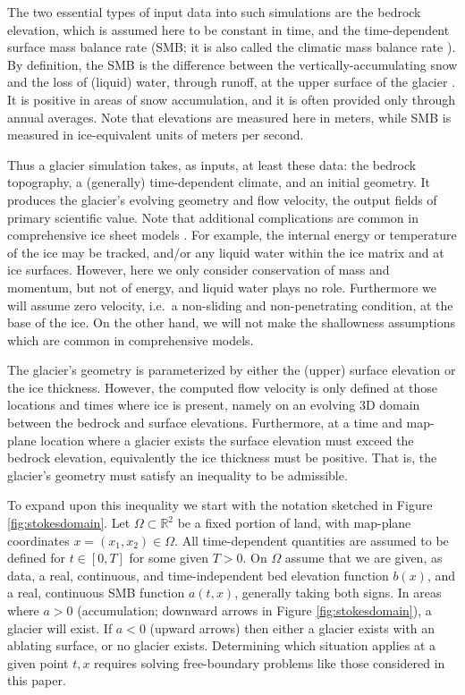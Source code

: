 \documentclass[hidelinks,onefignum,onetabnum,final]{siamart220329}  %
\newcommand{\RR}{\mathbb{R}}
\begin{document}
The two essential types of input data into such simulations are the bedrock elevation, which is assumed here to be constant in time, and the time-dependent surface mass balance rate (SMB; it is also called the climatic mass balance rate \cite{Cogleyetal2011}).  By definition, the SMB is the difference between the vertically-accumulating snow and the loss of (liquid) water, through runoff, at the upper surface of the glacier \cite{Cogleyetal2011}.  It is positive in areas of snow accumulation, and it is often provided only through annual averages.  Note that elevations are measured here in meters, while SMB is measured in ice-equivalent units of meters per second.

Thus a glacier simulation takes, as inputs, at least these data: the bedrock topography, a (generally) time-dependent climate, and an initial geometry.  It produces the glacier's evolving geometry and flow velocity, the output fields of primary scientific value.  Note that additional complications are common in comprehensive ice sheet models \cite{SchoofHewitt2013,Winkelmannetal2011}.  For example, the internal energy \cite{Aschwandenetal2012} or temperature of the ice may be tracked, and/or any liquid water within the ice matrix and at ice surfaces.  However, here we only consider conservation of mass and momentum, but not of energy, and liquid water plays no role.  Furthermore we will assume zero velocity, i.e.~a non-sliding and non-penetrating condition, at the base of the ice.  On the other hand, we will not make the shallowness assumptions which are common in comprehensive models.

The glacier's geometry is parameterized by either the (upper) surface elevation or the ice thickness.  However, the computed flow velocity is only defined at those locations and times where ice is present, namely on an evolving 3D domain between the bedrock and surface elevations.  Furthermore, at a time and map-plane location where a glacier exists the surface elevation must exceed the bedrock elevation, equivalently the ice thickness must be positive.  That is, the glacier's geometry must satisfy an inequality to be admissible.

To expand upon this inequality we start with the notation sketched in Figure \ref{fig:stokesdomain}.  Let $\Omega \subset \RR^2$ be a fixed portion of land, with map-plane coordinates $x=(x_1,x_2)\in\Omega$.  All time-dependent quantities are assumed to be defined for $t\in [0,T]$ for some given $T>0$.  On $\Omega$ assume that we are given, as data, a real, continuous, and time-independent bed elevation function $b(x)$, and a real, continuous SMB function $a(t,x)$, generally taking both signs.  In areas where $a>0$ (accumulation; downward arrows in Figure \ref{fig:stokesdomain}), a glacier will exist.  If $a<0$ (upward arrows) then either a glacier exists with an ablating surface, or no glacier exists.  Determining which situation applies at a given point $t,x$ requires solving free-boundary problems like those considered in this paper.
\end{document}
